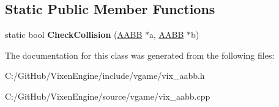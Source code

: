 \subsection*{Static Public Member Functions}
\begin{DoxyCompactItemize}
\item 
\hypertarget{class_vixen_1_1_a_a_b_b_a14dcc71bf7afd7fe39a3f438a7054273}{}static bool {\bfseries Check\+Collision} (\hyperlink{class_vixen_1_1_a_a_b_b}{A\+A\+B\+B} $\ast$a, \hyperlink{class_vixen_1_1_a_a_b_b}{A\+A\+B\+B} $\ast$b)\label{class_vixen_1_1_a_a_b_b_a14dcc71bf7afd7fe39a3f438a7054273}

\end{DoxyCompactItemize}


The documentation for this class was generated from the following files\+:\begin{DoxyCompactItemize}
\item 
C\+:/\+Git\+Hub/\+Vixen\+Engine/include/vgame/vix\+\_\+aabb.\+h\item 
C\+:/\+Git\+Hub/\+Vixen\+Engine/source/vgame/vix\+\_\+aabb.\+cpp\end{DoxyCompactItemize}
